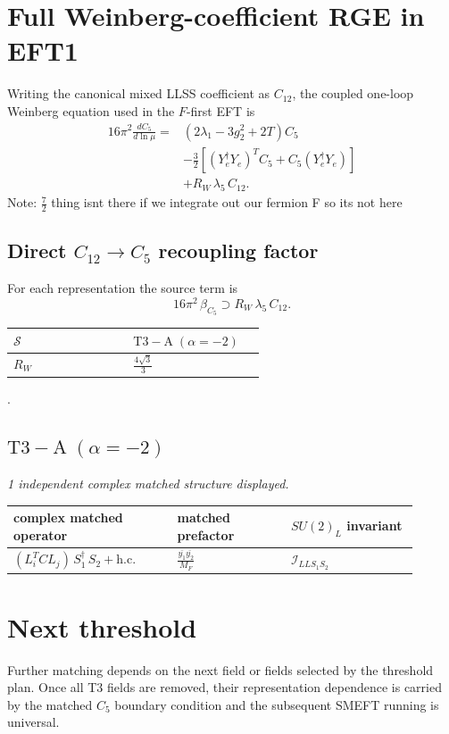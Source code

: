 \documentclass[9pt]{article}
\begin{document}
\section*{Full Weinberg-coefficient RGE in EFT1}
Writing the canonical mixed LLSS coefficient as $C_{12}$, the coupled one-loop Weinberg equation used in the $F$-first EFT is
\begin{align}
16\pi^2\frac{dC_5}{d\ln\mu}={}&(2\lambda_1-3g_2^2+2T)C_5\\
&-\frac32\left[(Y_e^\dagger Y_e)^T C_5+C_5(Y_e^\dagger Y_e)\right]\\
&+R_W\,\lambda_5\,C_{12}.
\end{align}
Note: $\frac{7}{2}$ thing isnt there if we integrate out our fermion F so its not here \subsection*{Direct $C_{12}\to C_5$ recoupling factor}
For each representation the source term is
\[16\pi^2\,\beta_{C_5}\supset R_W\,\lambda_5\,C_{12}.\]
\begin{longtable}{@{}p{0.37\linewidth}p{0.19\linewidth}@{}}
\toprule
$\mathcal{S}$ & $ \mathrm{T3-A}\;(\alpha=-2) $ \\
\midrule
$R_W$ & $ \frac{4 \sqrt{3}}{3} $ \\
\bottomrule
\end{longtable}
.
\subsection*{$ \mathrm{T3-A}\;(\alpha=-2) $}
\textit{1 independent complex matched structure displayed. }
\begin{longtable}{@{}p{0.36\linewidth}p{0.25\linewidth}p{0.29\linewidth}@{}}
\toprule
complex matched operator & matched prefactor & $SU(2)_L$ invariant \\
\midrule
$ (L_i^T C L_j)\,S_1^\dagger\,S_2+\mathrm{h.c.} $ & $ \frac{\overline{y_{1}} \overline{y_{2}}}{M_F} $ & $ \mathcal{I}_{LLS_1S_2} $ \\
\bottomrule
\end{longtable}
\section*{Next threshold}
Further matching depends on the next field or fields selected by the threshold plan.  Once all T3 fields are removed, their representation dependence is carried by the matched $C_5$ boundary condition and the subsequent SMEFT running is universal.
\end{document}
